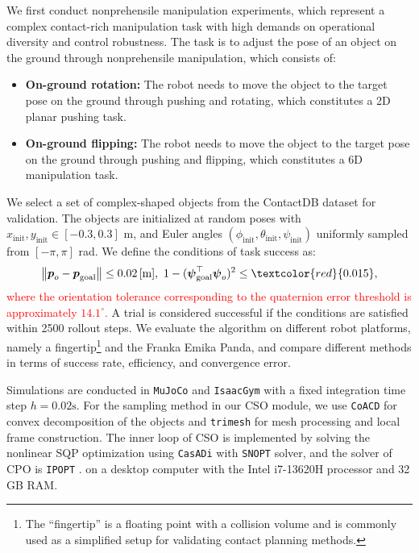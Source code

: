  We first conduct nonprehensile manipulation experiments, which represent a complex contact-rich manipulation task with high demands on operational diversity and control robustness. The task is to adjust the pose of an object on the ground through nonprehensile manipulation, which consists of:
\begin{itemize}
    \item \textbf{On-ground rotation:} The robot needs to move the object to the target pose on the ground through pushing and rotating, which constitutes a 2D planar pushing task.
    \item \textbf{On-ground flipping:} The robot needs to move the object to the target pose on the ground through pushing and flipping, which constitutes a 6D manipulation task.
\end{itemize}
We select a set of complex-shaped objects from the ContactDB dataset \cite{brahmbhatt2019contactdb} for validation. The objects are initialized at random poses with 
$x_{\text{init}}, y_{\text{init}} \in [-0.3, 0.3]$ m, 
and Euler angles $(\phi_{\text{init}}, \theta_{\text{init}} , \psi_{\text{init}})$ 
uniformly sampled from $[-\pi, \pi]$ rad. We define the conditions of task success as: 
\begin{equation}
    \left\| \boldsymbol{p}_o - \boldsymbol{p}_{\text{goal}} \right\|
\le 0.02 \,\text{[m]}, \ 
1 - (\boldsymbol{\psi}_{\text{goal}}^\top \boldsymbol{\psi}_o)^2
\le \textcolor{red}{0.015}, \label{eq:pose_success}
\end{equation}
\textcolor{red}{where the orientation tolerance corresponding to the quaternion error threshold is approximately $14.1^\circ$.} A trial is considered successful if the conditions are satisfied within 2500 rollout steps. We evaluate the algorithm on different robot platforms, namely a fingertip\footnote{The ``fingertip'' is a floating point with a collision volume and is commonly used as a simplified setup for validating contact planning methods.} and the Franka Emika Panda, and compare different methods in terms of success rate, efficiency, and convergence error.  

Simulations are conducted in \texttt{MuJoCo} \cite{todorov2012mujoco} and  \texttt{IsaacGym} \cite{makoviychuk2021isaac} with a fixed integration time step $h=0.02 \text{s}$. For the sampling method in our CSO module, we use \texttt{CoACD} \cite{wei2022approximate} for convex decomposition of the objects and \texttt{trimesh} for mesh processing and local frame construction. The inner loop of CSO is implemented by solving the nonlinear SQP optimization using \texttt{CasADi} \cite{Andersson2019} with \texttt{SNOPT} \cite{gill2005snopt} solver, and the solver of CPO is \texttt{IPOPT} \cite{wachter2006implementation}.  on a desktop computer with the Intel i7-13620H processor and 32 GB RAM.

